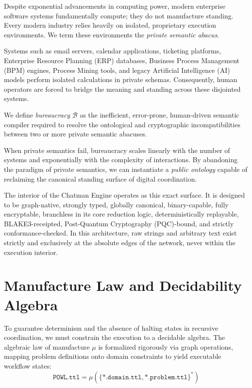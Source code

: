 Despite exponential advancements in computing power, modern enterprise software systems fundamentally compute; they do not manufacture standing. Every modern industry relies heavily on isolated, proprietary execution environments. We term these environments the \textit{private semantic abacus}. 

Systems such as email servers, calendar applications, ticketing platforms, Enterprise Resource Planning (ERP) databases, Business Process Management (BPM) engines, Process Mining tools, and legacy Artificial Intelligence (AI) models perform isolated calculations in private schemas. Consequently, human operators are forced to bridge the meaning and standing across these disjointed systems. 

\begin{definition}[Bureaucracy]
We define \textit{bureaucracy} $\mathcal{B}$ as the inefficient, error-prone, human-driven semantic compiler required to resolve the ontological and cryptographic incompatibilities between two or more private semantic abacuses.
\end{definition}

When private semantics fail, bureaucracy scales linearly with the number of systems and exponentially with the complexity of interactions. By abandoning the paradigm of private semantics, we can instantiate a \textit{public ontology} capable of reclaiming the canonical standing surface of digital coordination.

The interior of the Chatman Engine operates as this exact surface. It is designed to be graph-native, strongly typed, globally canonical, binary-capable, fully encryptable, branchless in its core reduction logic, deterministically replayable, BLAKE3-receipted, Post-Quantum Cryptography (PQC)-bound, and strictly conformance-checked. In this architecture, raw strings and arbitrary text exist strictly and exclusively at the absolute edges of the network, never within the execution interior.

\section{Manufacture Law and Decidability Algebra}

To guarantee determinism and the absence of halting states in recursive coordination, we must constrain the execution to a decidable algebra. The algebraic law of manufacture $\mu$ is formalized rigorously via graph operations, mapping problem definitions onto domain constraints to yield executable workflow states:
\begin{equation}
\texttt{POWL.ttl} = \mu(\{\ast\texttt{.domain.ttl}, \ast\texttt{.problem.ttl}\}^*)
\end{equation}

